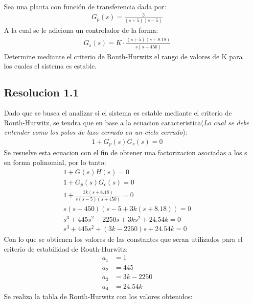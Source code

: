 \documentclass[
  11pt,
  letterpaper,
   addpoints,
   answers
  ]{exam}
\begin{document}
\begin{questions}
    \question Sea una planta con función de transferencia dada por:
    \begin{align}
        G_{p}(s) = \frac{3}{(s+5)(s-5)}
    \end{align}
    A la cual se le adiciona un controlador de la forma:
    \begin{align}
        G_{s}(s) = K \cdot \frac{(s+5)(s+8.18)}{s(s+450)} 
    \end{align}
    Determine mediante el criterio de Routh-Hurwitz el rango de valores de K para los cuales el sistema es estable.
    \begin{solution}
        \subsection*{Resolucion 1.1}
    Dado que se busca el analizar si el sistema es estable mediante el criterio de Routh-Hurwitz, se tendra que en base a la ecuacion caracteristica(\textit{La cual se debe entender como los polos de lazo cerrado en un ciclo cerrado}):
    \begin{align}
        1 + G_{p}(s)G_{s}(s) = 0
    \end{align}
    Se resuelve esta ecuacion con el fin de obtener una factorizacion asociadas a los s en forma polinomial, por lo tanto:
    \begin{align}
        1+G(s)H(s) = 0\\
        1+G_{p}(s)G_{c}(s) = 0\\
        1+\frac{3k(s+8.18)}{s(s-5)(s+450)} = 0\\
        s(s+450)(s-5 + 3k(s+8.18)) = 0\\
        s^{3} + 445s^{2} - 2250s + 3ks^{2} + 24.54k = 0\\
        s^{3} + 445s^{2} + (3k-2250)s + 24.54k = 0
    \end{align}
    Con lo que se obtienen los valores de las constantes que seran utilizados para el criterio de estabilidad de Routh-Hurwitz:
    \begin{align}
        a_{1} &= 1\\
        a_{2} &= 445\\
        a_{3} &= 3k-2250\\
        a_{4} &= 24.54k
    \end{align}
    Se realiza la tabla de Routh-Hurwitz con los valores obtenidos:
    \begin{center}

\end{center}
\end{solution}
\end{questions}
\end{document}
